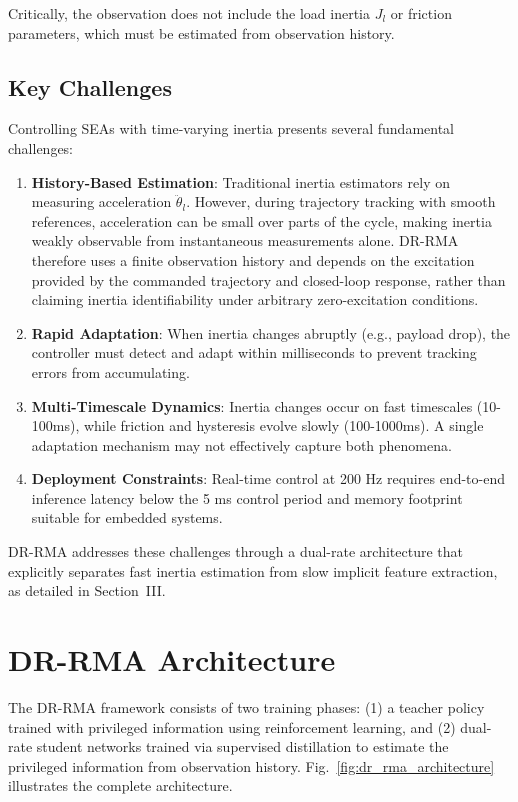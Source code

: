 \documentclass[lettersize,journal]{IEEEtran}
\begin{document}
Critically, the observation does not include the load inertia $J_l$ or friction parameters, which must be estimated from observation history.

\subsection{Key Challenges}

Controlling SEAs with time-varying inertia presents several fundamental challenges:

\begin{enumerate}
\item \textbf{History-Based Estimation}: Traditional inertia estimators rely on measuring acceleration $\ddot{\theta}_l$. However, during trajectory tracking with smooth references, acceleration can be small over parts of the cycle, making inertia weakly observable from instantaneous measurements alone. DR-RMA therefore uses a finite observation history and depends on the excitation provided by the commanded trajectory and closed-loop response, rather than claiming inertia identifiability under arbitrary zero-excitation conditions.

\item \textbf{Rapid Adaptation}: When inertia changes abruptly (e.g., payload drop), the controller must detect and adapt within milliseconds to prevent tracking errors from accumulating.

\item \textbf{Multi-Timescale Dynamics}: Inertia changes occur on fast timescales (10-100ms), while friction and hysteresis evolve slowly (100-1000ms). A single adaptation mechanism may not effectively capture both phenomena.

\item \textbf{Deployment Constraints}: Real-time control at 200 Hz requires end-to-end inference latency below the 5 ms control period and memory footprint suitable for embedded systems.
\end{enumerate}

DR-RMA addresses these challenges through a dual-rate architecture that explicitly separates fast inertia estimation from slow implicit feature extraction, as detailed in Section~III.

\section{DR-RMA Architecture}

The DR-RMA framework consists of two training phases: (1) a teacher policy trained with privileged information using reinforcement learning, and (2) dual-rate student networks trained via supervised distillation to estimate the privileged information from observation history. Fig.~\ref{fig:dr_rma_architecture} illustrates the complete architecture.
\end{document}

